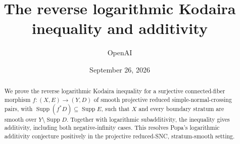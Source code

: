 \documentclass[11pt,reqno]{amsart}
\title[Reverse logarithmic Kodaira inequality]{The reverse logarithmic Kodaira inequality and additivity}
\author{OpenAI}
\date{September 26, 2026}
\DeclareMathOperator{\Supp}{Supp}
\theoremstyle{plain}
\theoremstyle{definition}
\theoremstyle{remark}
\numberwithin{equation}{section}
\begin{document}
\begin{abstract}
We prove the reverse logarithmic Kodaira inequality for a surjective
connected-fiber morphism $f:(X,E)\to(Y,D)$ of smooth projective
reduced simple-normal-crossing pairs, with
$\Supp(f^*D)\subseteq\Supp E$, such that $X$ and every boundary
stratum are smooth over $Y\setminus\Supp D$. Together with logarithmic
subadditivity, the inequality gives additivity, including both
negative-infinity cases. This resolves Popa's logarithmic additivity
conjecture positively in the projective reduced-SNC, stratum-smooth setting.
\end{abstract}
\maketitle
\tableofcontents











\end{document}
